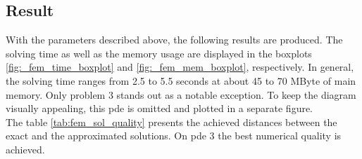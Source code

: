 \documentclass[./\jobname.tex]{subfiles}
\begin{document}
\subsection{Result}
With the parameters described above, the following results are produced. The solving time as well as the memory usage are displayed in the boxplots \ref{fig:_fem_time_boxplot} and \ref{fig:_fem_mem_boxplot}, respectively. In general, the solving time ranges from 2.5 to 5.5 seconds at about 45 to 70 MByte of main memory. Only problem 3 stands out as a notable exception. To keep the diagram visually appealing, this \gls{pde} is omitted and plotted in a separate figure. \\
The table \ref{tab:fem_sol_quality} presents the achieved distances between the exact and the approximated solutions. On \gls{pde} 3 the best numerical quality is achieved.

\begin{table}[h]
	\centering
	\noindent{}
	\label{tab:fem_sol_quality}
\end{table}
\end{document}
